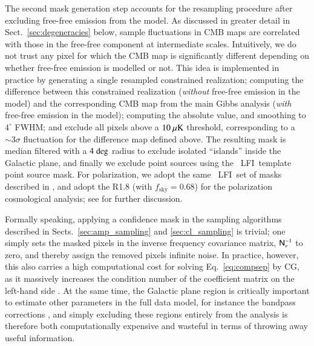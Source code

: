 \documentclass[twocolumn]{aa}
\newcommand{\N}[0]{\tens{N}}
\newcommand{\lfi}[0]{LFI}
\begin{document}
The second mask generation step accounts for the resampling procedure
after excluding free-free emission from the model. As discussed in greater detail in Sect.~\ref{sec:degeneracies} below, sample fluctuations in CMB maps are correlated with those in the free-free component at intermediate scales. Intuitively, we do 
not trust any pixel for which the CMB map is significantly different
depending on whether free-free emission is modelled or not. This idea
is implemented in practice by generating a single resampled
constrained realization; computing the difference between this
constrained realization (\emph{without} free-free emission in the
model) and the corresponding CMB map from the main Gibbs analysis
(\emph{with} free-free emission in the model); computing the absolute
value, and smoothing to $4^{\circ}$ FWHM; and exclude all pixels above
a $10\:\mu\rm{K}$ threshold, corresponding to a $\sim 3\sigma$ fluctuation for the difference map defined above. The resulting mask is median filtered
with a $4\;\rm{deg}$ radius to exclude isolated ``islands'' inside the
Galactic plane, and finally we exclude point sources using the
\Planck\ \lfi\ template point source mask. For polarization, we adopt
the same \Planck\ \lfi\ set of masks described in
\citet{planck2016-l05}, and adopt the R1.8 (with
$f_{\mathrm{sky}}=0.68$) for the polarization cosmological analysis;
see \cite{bp12} for further discussion.

Formally speaking, applying a confidence mask in the sampling
algorithms described in Sects.~\ref{sec:amp_sampling} and
\ref{sec:cl_sampling} is trivial; one simply sets the masked pixels in
the inverse frequency covariance matrix, $\N_{\nu}^{-1}$ to zero, and
thereby assign the removed pixels infinite noise. In practice,
however, this also carries a high computational cost for solving
Eq.~\eqref{eq:compsep} by CG, as it massively increases the condition
number of the coefficient matrix on the left-hand side
\citep{seljebotn:2019}. At the same time, the Galactic plane region is
critically important to estimate other parameters in the full data
model, for instance the bandpass corrections \citep{bp09}, and simply
excluding these regions entirely from the analysis is therefore both
computationally expensive and wasteful in terms of throwing away
useful information.
\end{document}
